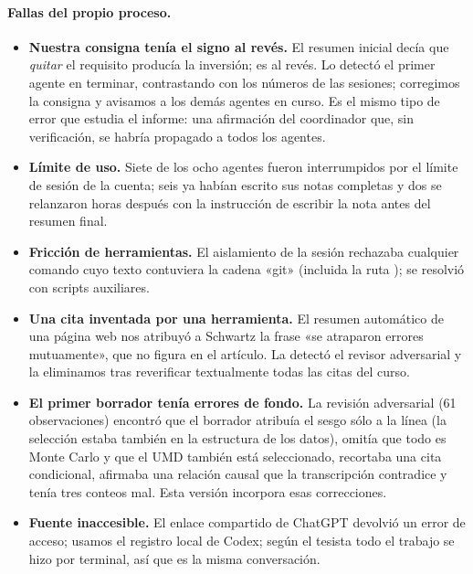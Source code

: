 \paragraph{Fallas del propio proceso.}
\begin{itemize}
  \item \textbf{Nuestra consigna tenía el signo al revés.} El resumen inicial decía que \emph{quitar} el
  requisito producía la inversión; es al revés. Lo detectó el primer agente en terminar, contrastando con
  los números de las sesiones; corregimos la consigna y avisamos a los demás agentes en curso. Es el mismo
  tipo de error que estudia el informe: una afirmación del coordinador que, sin verificación, se habría
  propagado a todos los agentes.
  \item \textbf{Límite de uso.} Siete de los ocho agentes fueron interrumpidos por el límite de sesión de la
  cuenta; seis ya habían escrito sus notas completas y dos se relanzaron horas después con la instrucción
  de escribir la nota antes del resumen final.
  \item \textbf{Fricción de herramientas.} El aislamiento de la sesión rechazaba cualquier comando cuyo
  texto contuviera la cadena «git» (incluida la ruta ); se resolvió con scripts auxiliares.
  \item \textbf{Una cita inventada por una herramienta.} El resumen automático de una página web nos atribuyó
  a Schwartz la frase «se atraparon errores mutuamente», que no figura en el artículo. La detectó el revisor
  adversarial y la eliminamos tras reverificar textualmente todas las citas del curso.
  \item \textbf{El primer borrador tenía errores de fondo.} La revisión adversarial (61 observaciones) encontró
  que el borrador atribuía el sesgo sólo a la línea  (la selección estaba también en la
  estructura de los datos), omitía que todo es Monte Carlo y que el UMD también está seleccionado, recortaba
  una cita condicional, afirmaba una relación causal que la transcripción contradice y tenía tres conteos mal.
  Esta versión incorpora esas correcciones.
  \item \textbf{Fuente inaccesible.} El enlace compartido de ChatGPT devolvió un error de acceso; usamos el
  registro local de Codex; según el tesista todo el trabajo se hizo por terminal, así que es la misma
  conversación.
\end{itemize}
